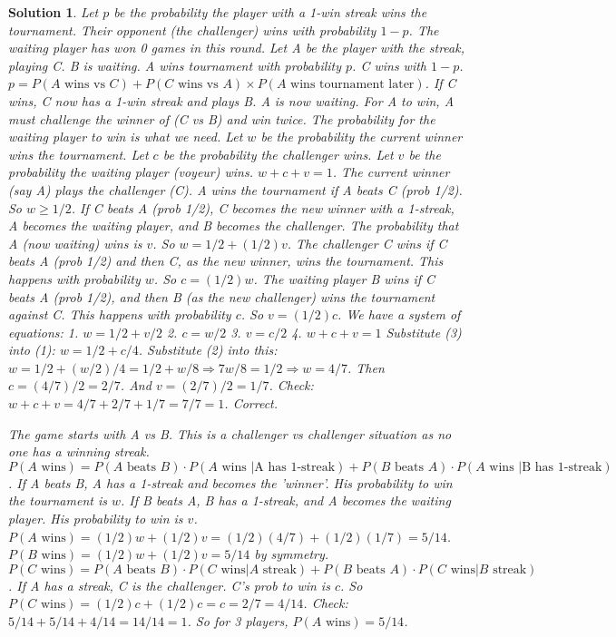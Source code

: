 \documentclass[12pt]{amsart}
\newtheorem*{solution}{Solution}
\begin{document}
\begin{solution}
Let $p$ be the probability the player with a 1-win streak wins the tournament. Their opponent (the challenger) wins with probability $1-p$. The waiting player has won 0 games in this round.
Let A be the player with the streak, playing C. B is waiting.
A wins tournament with probability $p$. C wins with $1-p$.
$p = P(A \text{ wins vs } C) + P(C \text{ wins vs } A) \times P(A \text{ wins tournament later})$.
If C wins, C now has a 1-win streak and plays B. A is now waiting. For A to win, A must challenge the winner of (C vs B) and win twice. The probability for the waiting player to win is what we need.
Let $w$ be the probability the current winner wins the tournament. Let $c$ be the probability the challenger wins. Let $v$ be the probability the waiting player (voyeur) wins. $w+c+v=1$.
The current winner (say A) plays the challenger (C).
A wins the tournament if A beats C (prob 1/2). So $w \geq 1/2$.
If C beats A (prob 1/2), C becomes the new winner with a 1-streak, A becomes the waiting player, and B becomes the challenger. The probability that A (now waiting) wins is $v$.
So $w = 1/2 + (1/2)v$.
The challenger C wins if C beats A (prob 1/2) and then C, as the new winner, wins the tournament. This happens with probability $w$. So $c = (1/2)w$.
The waiting player B wins if C beats A (prob 1/2), and then B (as the new challenger) wins the tournament against C. This happens with probability $c$. So $v = (1/2)c$.
We have a system of equations:
1. $w = 1/2 + v/2$
2. $c = w/2$
3. $v = c/2$
4. $w+c+v=1$
Substitute (3) into (1): $w=1/2+c/4$.
Substitute (2) into this: $w=1/2+(w/2)/4 = 1/2+w/8 \Rightarrow 7w/8 = 1/2 \Rightarrow w=4/7$.
Then $c = (4/7)/2 = 2/7$.
And $v = (2/7)/2 = 1/7$.
Check: $w+c+v = 4/7+2/7+1/7 = 7/7=1$. Correct.

The game starts with A vs B. This is a challenger vs challenger situation as no one has a winning streak.
$P(A \text{ wins}) = P(A \text{ beats } B) \cdot P(A \text{ wins } | \text{A has 1-streak}) + P(B \text{ beats } A) \cdot P(A \text{ wins } | \text{B has 1-streak})$.
If A beats B, A has a 1-streak and becomes the 'winner'. His probability to win the tournament is $w$.
If B beats A, B has a 1-streak, and A becomes the waiting player. His probability to win is $v$.
$P(A \text{ wins}) = (1/2)w + (1/2)v = (1/2)(4/7) + (1/2)(1/7) = 5/14$.
$P(B \text{ wins}) = (1/2)w + (1/2)v = 5/14$ by symmetry.
$P(C \text{ wins}) = P(A \text{ beats } B) \cdot P(C \text{ wins}|A \text{ streak}) + P(B \text{ beats } A) \cdot P(C \text{ wins}|B \text{ streak})$.
If A has a streak, C is the challenger. C's prob to win is $c$. So $P(C \text{ wins}) = (1/2)c + (1/2)c = c = 2/7 = 4/14$.
Check: $5/14 + 5/14 + 4/14 = 14/14 = 1$.
So for 3 players, $P(A \text{ wins}) = 5/14$.


\end{solution}
\end{document}
